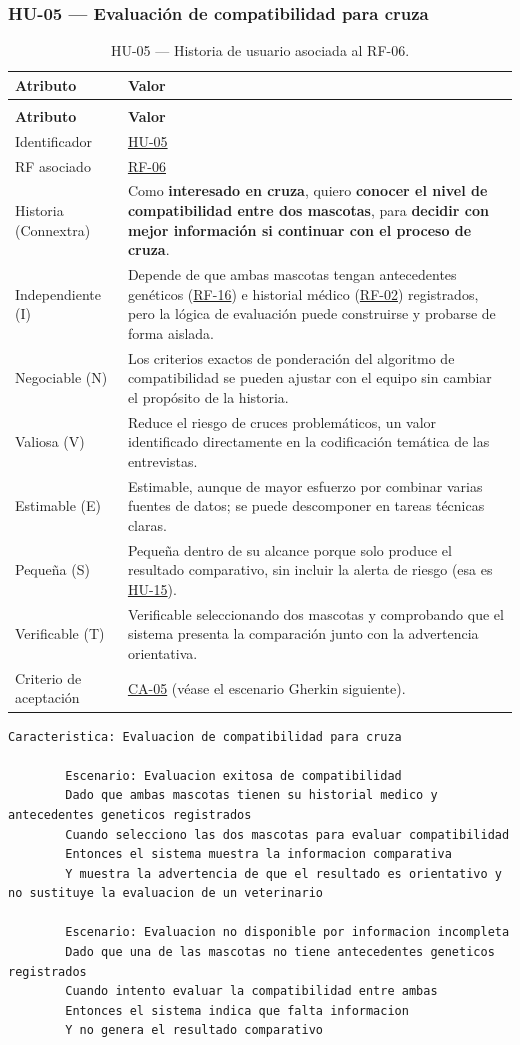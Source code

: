 \documentclass[journal,onecolumn]{IEEEtran}
\makeatletter
\newenvironment{atributos}[2]{%
	\small
	\begin{longtable}{@{}>{\raggedright\arraybackslash}p{4.2cm} >{\raggedright\arraybackslash}p{11.2cm}@{}}
		\caption{#2}\label{tab:#1}\\
		\toprule
		\textbf{Atributo} & \textbf{Valor} \\
		\midrule
		\endfirsthead
		\multicolumn{2}{@{}l}{\small\itshape (continuación)}\\
		\toprule
		\textbf{Atributo} & \textbf{Valor} \\
		\midrule
		\endhead
		\bottomrule
		\endlastfoot
	}{%
	\end{longtable}
	\normalsize
}
\makeatother
\begin{document}
	\subsubsection{HU-05 --- Evaluación de compatibilidad para cruza}
	
	\begin{atributos}{HU-05}{HU-05 --- Historia de usuario asociada al RF-06.}
		Identificador & \hyperref[tab:HU-05]{HU-05} \\
		RF asociado & \hyperref[tab:RF-06]{RF-06} \\
		Historia (Connextra) & Como \textbf{interesado en cruza}, quiero \textbf{conocer el nivel de compatibilidad entre dos mascotas}, para \textbf{decidir con mejor información si continuar con el proceso de cruza}. \\
		Independiente (I) & Depende de que ambas mascotas tengan antecedentes genéticos (\hyperref[tab:RF-16]{RF-16}) e historial médico (\hyperref[tab:RF-02]{RF-02}) registrados, pero la lógica de evaluación puede construirse y probarse de forma aislada. \\
		Negociable (N) & Los criterios exactos de ponderación del algoritmo de compatibilidad se pueden ajustar con el equipo sin cambiar el propósito de la historia. \\
		Valiosa (V) & Reduce el riesgo de cruces problemáticos, un valor identificado directamente en la codificación temática de las entrevistas. \\
		Estimable (E) & Estimable, aunque de mayor esfuerzo por combinar varias fuentes de datos; se puede descomponer en tareas técnicas claras. \\
		Pequeña (S) & Pequeña dentro de su alcance porque solo produce el resultado comparativo, sin incluir la alerta de riesgo (esa es \hyperref[tab:HU-15]{HU-15}). \\
		Verificable (T) & Verificable seleccionando dos mascotas y comprobando que el sistema presenta la comparación junto con la advertencia orientativa. \\
		Criterio de aceptación & \hyperref[lst:ca05]{CA-05} (véase el escenario Gherkin siguiente). \\
	\end{atributos}
	
	\begin{lstlisting}[style=gherkin,caption={CA-05 --- Escenario de aceptación de la historia HU-05.},label={lst:ca05}]
		Caracteristica: Evaluacion de compatibilidad para cruza
		
		Escenario: Evaluacion exitosa de compatibilidad
		Dado que ambas mascotas tienen su historial medico y antecedentes geneticos registrados
		Cuando selecciono las dos mascotas para evaluar compatibilidad
		Entonces el sistema muestra la informacion comparativa
		Y muestra la advertencia de que el resultado es orientativo y no sustituye la evaluacion de un veterinario
		
		Escenario: Evaluacion no disponible por informacion incompleta
		Dado que una de las mascotas no tiene antecedentes geneticos registrados
		Cuando intento evaluar la compatibilidad entre ambas
		Entonces el sistema indica que falta informacion
		Y no genera el resultado comparativo
	\end{lstlisting}
	
\end{document}
